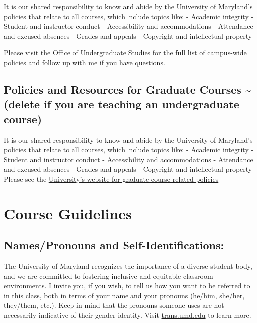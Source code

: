 \documentclass[11pt]{article}
\begin{document}
It is our shared responsibility to know and abide by the University of
Maryland's policies that relate to all courses, which include topics
like: - Academic integrity - Student and instructor conduct -
Accessibility and accommodations - Attendance and excused absences -
Grades and appeals - Copyright and intellectual property

Please visit \href{www.ugst.umd.edu/courserelatedpolicies.html}{the
Office of Undergraduate Studies} for the full list of campus-wide
policies and follow up with me if you have questions.

\hypertarget{policies-and-resources-for-graduate-courses-delete-if-you-are-teaching-an-undergraduate-course}{%
\subsection{Policies and Resources for Graduate Courses
\textasciitilde(delete if you are teaching an undergraduate
course)}\label{policies-and-resources-for-graduate-courses-delete-if-you-are-teaching-an-undergraduate-course}}

It is our shared responsibility to know and abide by the University of
Maryland's policies that relate to all courses, which include topics
like: - Academic integrity - Student and instructor conduct -
Accessibility and accommodations - Attendance and excused absences -
Grades and appeals - Copyright and intellectual property Please see the
\href{https://gradschool.umd.edu/course-related-policies}{University's
website for graduate course-related policies}

\hypertarget{course-guidelines}{%
\section{Course Guidelines}\label{course-guidelines}}

\hypertarget{namespronouns-and-self-identifications}{%
\subsection{Names/Pronouns and
Self-Identifications:}\label{namespronouns-and-self-identifications}}

The University of Maryland recognizes the importance of a diverse
student body, and we are committed to fostering inclusive and equitable
classroom environments. I invite you, if you wish, to tell us how you
want to be referred to in this class, both in terms of your name and
your pronouns (he/him, she/her, they/them, etc.). Keep in mind that the
pronouns someone uses are not necessarily indicative of their gender
identity. Visit \url{trans.umd.edu} to learn more.
\end{document}
